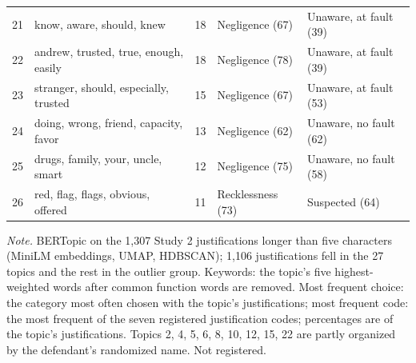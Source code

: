 \begin{table}[H]
\begin{tabular}{rp{4.4cm}rll}
21 & \raggedright know, aware, should, knew & 18 & Negligence (67) & Unaware, at fault (39) \tabularnewline
22 & \raggedright andrew, trusted, true, enough, easily & 18 & Negligence (78) & Unaware, at fault (39) \tabularnewline
23 & \raggedright stranger, should, especially, trusted & 15 & Negligence (67) & Unaware, at fault (53) \tabularnewline
24 & \raggedright doing, wrong, friend, capacity, favor & 13 & Negligence (62) & Unaware, no fault (62) \tabularnewline
25 & \raggedright drugs, family, your, uncle, smart & 12 & Negligence (75) & Unaware, no fault (58) \tabularnewline
26 & \raggedright red, flag, flags, obvious, offered & 11 & Recklessness (73) & Suspected (64) \tabularnewline
\bottomrule
\end{tabular}

\vspace{0.5em}
\begin{flushleft}
\footnotesize
\textit{Note.} BERTopic on the 1,307 Study 2 justifications longer than five characters (MiniLM embeddings, UMAP, HDBSCAN); 1,106 justifications fell in the 27 topics and the rest in the outlier group. Keywords: the topic's five highest-weighted words after common function words are removed. Most frequent choice: the category most often chosen with the topic's justifications; most frequent code: the most frequent of the seven registered justification codes; percentages are of the topic's justifications. Topics 2, 4, 5, 6, 8, 10, 12, 15, 22 are partly organized by the defendant's randomized name. Not registered.
\end{flushleft}
\end{table}
